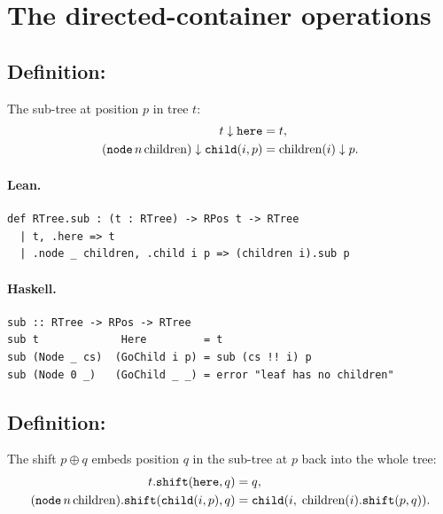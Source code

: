 \documentclass[11pt,a4paper]{article}
\begin{document}
\section{The directed-container operations}

\subsection{Definition: }

\begin{defn}
The sub-tree at position $p$ in tree $t$:
\begin{align*}
  t \downarrow \texttt{here} &= t, \\
  (\texttt{node}\,n\,\mathrm{children}) \downarrow \texttt{child}(i, p)
    &= \mathrm{children}(i) \downarrow p.
\end{align*}
\end{defn}

\paragraph{Lean.}
\begin{lstlisting}[style=lean]
def RTree.sub : (t : RTree) -> RPos t -> RTree
  | t, .here => t
  | .node _ children, .child i p => (children i).sub p
\end{lstlisting}

\paragraph{Haskell.}
\begin{lstlisting}[style=haskell]
sub :: RTree -> RPos -> RTree
sub t             Here         = t
sub (Node _ cs)  (GoChild i p) = sub (cs !! i) p
sub (Node 0 _)   (GoChild _ _) = error "leaf has no children"
\end{lstlisting}


\subsection{Definition: }

\begin{defn}
The shift $p \oplus q$ embeds position $q$ in the sub-tree at $p$ back
into the whole tree:
\begin{align*}
  t.\texttt{shift}(\texttt{here}, q) &= q, \\
  (\texttt{node}\,n\,\mathrm{children}).\texttt{shift}(\texttt{child}(i, p), q)
    &= \texttt{child}(i,\; \mathrm{children}(i).\texttt{shift}(p, q)).
\end{align*}
\end{defn}
\end{document}
